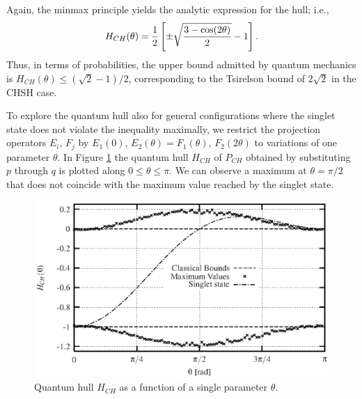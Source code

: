 \documentclass[pra,showpacs,showkeys,amsfonts]{revtex4}
\begin{document}
Again, the minmax principle yields the analytic expression for the hull; i.e.,
\begin{equation}
H_{CH}(\theta )={1\over 2}\left[\pm {\sqrt{3-\cos (2\theta )\over 2}} - 1 \right]
.
\end{equation}
Thus, in terms of
probabilities,
the upper bound admitted by quantum mechanics is
$H_{CH}(\theta ) \le (\sqrt{2}-1) /2$, corresponding to the Tsirelson bound of $2\sqrt{2}$
in the CHSH case.

To explore the quantum hull also for general configurations where
the singlet state does not violate the inequality maximally,
we restrict the projection operators $E_i,\,F_j$ by
${E}_1(0)$, ${E}_2(\theta)={F}_1(\theta)$, ${F}_2(2\theta)$ to variations of one parameter
$\theta$.
In Figure  \ref{f-2003-qpoly-3} the quantum hull  $H_{CH}$ of $P_{CH}$
obtained by substituting $p$ through $q$ is plotted
along $0 \le \theta \le \pi$. We can observe a maximum at
$\theta=\pi/2$ that does not coincide with the maximum value reached
by the singlet state.
\begin{figure}
  \centering
  \includegraphics{2003-qpoly-plotch}
  \caption{Quantum hull $H_{CH}$
as a function of a single parameter $\theta$.}
  \label{f-2003-qpoly-3}
\end{figure}
\end{document}
